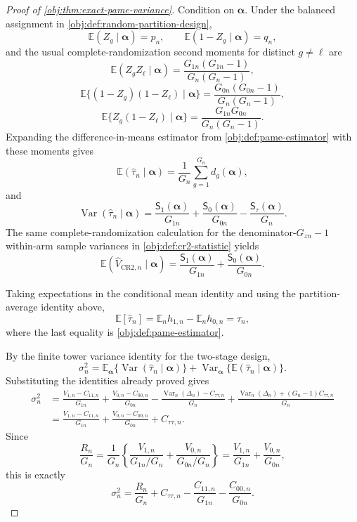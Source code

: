 \documentclass[11pt]{article}
\begin{document}
\begin{proof}[Proof of \cref{obj:thm:exact-pame-variance}]
Condition on \(\boldsymbol\alpha\). Under the balanced assignment in
\cref{obj:def:random-partition-design},
\[
\mathbb E(Z_g\mid\boldsymbol\alpha)=p_n,\qquad
\mathbb E(1-Z_g\mid\boldsymbol\alpha)=q_n,
\]
and the usual complete-randomization second moments for distinct \(g\ne \ell\) are
\[
\mathbb E(Z_gZ_\ell\mid\boldsymbol\alpha)
=\frac{G_{1n}(G_{1n}-1)}{G_n(G_n-1)},
\]
\[
\mathbb E\{(1-Z_g)(1-Z_\ell)\mid\boldsymbol\alpha\}
=\frac{G_{0n}(G_{0n}-1)}{G_n(G_n-1)},
\]
\[
\mathbb E\{Z_g(1-Z_\ell)\mid\boldsymbol\alpha\}
=\frac{G_{1n}G_{0n}}{G_n(G_n-1)}.
\]
Expanding the difference-in-means estimator from \cref{obj:def:pame-estimator} with these moments gives
\[
\mathbb E(\widehat\tau_n\mid\boldsymbol\alpha)
=
\frac1{G_n}\sum_{g=1}^{G_n}d_g(\boldsymbol\alpha),
\]
and
\[
\operatorname{Var}(\widehat\tau_n\mid\boldsymbol\alpha)
=
\frac{\mathsf S_1(\boldsymbol\alpha)}{G_{1n}}
+
\frac{\mathsf S_0(\boldsymbol\alpha)}{G_{0n}}
-
\frac{\mathsf S_\tau(\boldsymbol\alpha)}{G_n}.
\]
The same complete-randomization calculation for the denominator-\(G_{zn}-1\) within-arm sample variances in \cref{obj:def:cr2-statistic} yields
\[
\mathbb E(\widehat V_{\mathrm{CR2},n}\mid\boldsymbol\alpha)
=
\frac{\mathsf S_1(\boldsymbol\alpha)}{G_{1n}}
+
\frac{\mathsf S_0(\boldsymbol\alpha)}{G_{0n}} .
\]

Taking expectations in the conditional mean identity and using the partition-average identity above,
\[
\mathbb E[\widehat\tau_n]
=
\mathbb E_n h_{1,n}-\mathbb E_n h_{0,n}
=
\tau_n,
\]
where the last equality is \cref{obj:def:pame-estimator}. %

By the finite tower variance identity for the two-stage design,
\[
\sigma_n^2
=
\mathbb E_{\boldsymbol\alpha}\{\operatorname{Var}(\widehat\tau_n\mid\boldsymbol\alpha)\}
+
\operatorname{Var}_{\boldsymbol\alpha}\{\mathbb E(\widehat\tau_n\mid\boldsymbol\alpha)\}.
\]
Substituting the identities already proved gives
\[
\begin{aligned}
\sigma_n^2
&=
\frac{V_{1,n}-C_{11,n}}{G_{1n}}
+
\frac{V_{0,n}-C_{00,n}}{G_{0n}}
-
\frac{\operatorname{Var}_n(\Delta_n)-C_{\tau\tau,n}}{G_n}
+
\frac{\operatorname{Var}_n(\Delta_n)+(G_n-1)C_{\tau\tau,n}}{G_n} \\
&=
\frac{V_{1,n}-C_{11,n}}{G_{1n}}
+
\frac{V_{0,n}-C_{00,n}}{G_{0n}}
+
C_{\tau\tau,n}.
\end{aligned}
\]
Since
\[
\frac{R_n}{G_n}
=
\frac1{G_n}
\left\{
\frac{V_{1,n}}{G_{1n}/G_n}
+
\frac{V_{0,n}}{G_{0n}/G_n}
\right\}
=
\frac{V_{1,n}}{G_{1n}}+\frac{V_{0,n}}{G_{0n}},
\]
this is exactly
\[
\sigma_n^2
=
\frac{R_n}{G_n}
+
C_{\tau\tau,n}
-
\frac{C_{11,n}}{G_{1n}}
-
\frac{C_{00,n}}{G_{0n}} .
\]


\end{proof}
\end{document}
